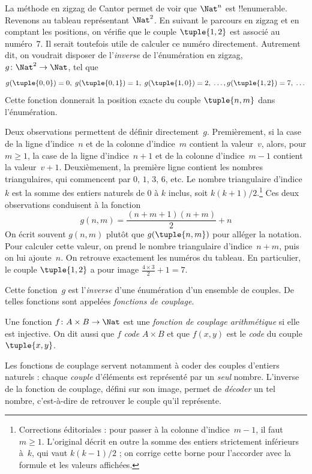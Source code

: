 \documentclass[11pt,a4paper,openany]{memoir}
\begin{document}
\begin{explain}
La méthode en zigzag de Cantor permet de voir que $\Nat^n$ est
!!{enumerable}. Revenons au tableau représentant $\Nat^2$.
En suivant le parcours en zigzag et en comptant les positions,
on vérifie que le couple $\tuple{1,2}$ est associé au numéro~$7$.
Il serait toutefois utile de calculer ce numéro directement.
Autrement dit, on voudrait disposer de l’\emph{inverse} de
l’énumération en zigzag, $g\colon \Nat^2 \to \Nat$, tel que
\[
g(\tuple{0,0}) = 0, \;
g(\tuple{0,1}) = 1, \;
g(\tuple{1,0}) = 2, \; \dots,
g(\tuple{1,2}) = 7, \; \dots
\]
Cette fonction donnerait la position exacte du couple $\tuple{n, m}$
dans l’énumération.

Deux observations permettent de définir directement~$g$.
Premièrement, si la case de la ligne d’indice~$n$ et de la colonne
d’indice~$m$ contient la valeur~$v$, alors, pour $m\geq 1$, la case
de la ligne d’indice~$n+1$ et de la colonne d’indice~$m-1$ contient
la valeur~$v+1$. Deuxièmement, la première ligne contient les nombres
triangulaires, qui commencent par $0$, $1$, $3$, $6$, etc.
Le nombre triangulaire d’indice~$k$ est la somme des entiers naturels
de $0$ à $k$ inclus, soit $k(k+1)/2$.\footnote{Corrections éditoriales :
pour passer à la colonne d’indice~$m-1$, il faut $m\geq 1$.
L’original décrit en outre la somme des entiers strictement inférieurs
à~$k$, qui vaut $k(k-1)/2$ ; on corrige cette borne pour l’accorder
avec la formule et les valeurs affichées.}
Ces deux observations conduisent à la fonction
\[
  g(n,m) = \frac{(n+m+1)(n+m)}{2} + n
\]
On écrit souvent $g(n, m)$ plutôt que $g(\tuple{n, m})$ pour alléger
la notation. Pour calculer cette valeur, on prend le nombre triangulaire
d’indice~$n+m$, puis on lui ajoute~$n$. On retrouve exactement
les numéros du tableau. En particulier, le couple $\tuple{1, 2}$
a pour image $\frac{4 \times 3}{2} + 1 = 7$.

Cette fonction~$g$ est l’\emph{inverse} d’une énumération
d’un ensemble de couples. De telles fonctions sont appelées
\emph{fonctions de couplage}.
\end{explain}

\begin{defn}
Une fonction $f\colon A \times B \to \Nat$ est une
\emph{fonction de couplage arithmétique} si elle est injective.
On dit aussi que $f$ \emph{code} $A \times B$ et que $f(x,y)$
est le \emph{code} du couple $\tuple{x,y}$.
\end{defn}

\begin{explain}
Les fonctions de couplage servent notamment à coder des couples
d’entiers naturels : chaque \emph{couple} d’éléments est représenté
par un \emph{seul} nombre. L’inverse de la fonction de couplage,
défini sur son image, permet de \emph{décoder} un tel nombre,
c’est-à-dire de retrouver le couple qu’il représente.
\end{explain}
\end{document}
